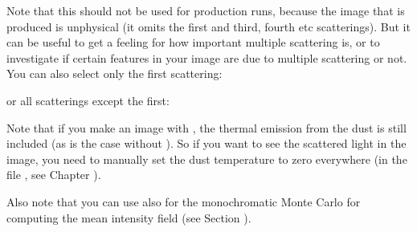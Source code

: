 \documentclass[letterpaper,10pt,english]{sphinxmanual}
\begin{document}
\begin{sphinxVerbatim}[commandchars=\\\{\}]
      
\end{sphinxVerbatim}

Note that this should not be used for production runs, because the image that
is produced is unphysical (it omits the first and third, fourth etc scatterings).
But it can be useful to get a feeling for how important multiple scattering
is, or to investigate if certain features in your image are due to multiple
scattering or not. You can also select only the first scattering:

\begin{sphinxVerbatim}[commandchars=\\\{\}]
      
\end{sphinxVerbatim}

or all scatterings except the first:

\begin{sphinxVerbatim}[commandchars=\\\{\}]
      
\end{sphinxVerbatim}

Note that if you make an image with , the thermal emission from
the dust is still included (as is the case without ). So if
you want to see  the scattered light in the image, you need to manually
set the dust temperature to zero everywhere (in the file ,
see Chapter {\hyperref[\detokenize{inputoutputfiles:chap-input-files}]{}}).

Also note that you can use  also for the monochromatic
Monte Carlo for computing the mean intensity field
(see Section {\hyperref[\detokenize{dustradtrans:sec-dust-monochromatic-monte-carlo}]{}}).
\end{document}
